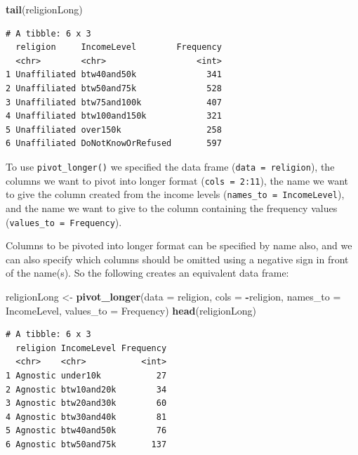 \documentclass[
]{krantz}
\makeatletter
\newenvironment{Shaded}{\begin{snugshade}}{\end{snugshade}}
\newcommand{\DataTypeTok}[1]{\textcolor[rgb]{0.27,0.27,0.27}{#1}}
\newcommand{\KeywordTok}[1]{\textcolor[rgb]{0.27,0.27,0.27}{\textbf{#1}}}
\newcommand{\NormalTok}[1]{#1}
\newcommand{\OperatorTok}[1]{\textcolor[rgb]{0.43,0.43,0.43}{\textbf{#1}}}
\newcommand{\StringTok}[1]{\textcolor[rgb]{0.5,0.5,0.5}{#1}}
\newenvironment{kframe}{%
\medskip{}
\setlength{\fboxsep}{.8em}
 \def\at@end@of@kframe{}%
 \ifinner\ifhmode%
  \def\at@end@of@kframe{\end{minipage}}%
  \begin{minipage}{\columnwidth}%
 \fi\fi%
 \def\FrameCommand##1{\hskip\@totalleftmargin \hskip-\fboxsep
 \colorbox{shadecolor}{##1}\hskip-\fboxsep
     \hskip-\linewidth \hskip-\@totalleftmargin \hskip\columnwidth}%
 \MakeFramed {\advance\hsize-\width
   \@totalleftmargin\z@ \linewidth\hsize
   \@setminipage}}%
 {\par\unskip\endMakeFramed%
 \at@end@of@kframe}
\renewenvironment{Shaded}{\begin{kframe}}{\end{kframe}}
\makeatother
\begin{document}
\begin{Shaded}
\begin{Highlighting}[]
\KeywordTok{tail}\NormalTok{(religionLong)}
\end{Highlighting}
\end{Shaded}

\begin{verbatim}
# A tibble: 6 x 3
  religion     IncomeLevel        Frequency
  <chr>        <chr>                  <int>
1 Unaffiliated btw40and50k              341
2 Unaffiliated btw50and75k              528
3 Unaffiliated btw75and100k             407
4 Unaffiliated btw100and150k            321
5 Unaffiliated over150k                 258
6 Unaffiliated DoNotKnowOrRefused       597
\end{verbatim}

To use \texttt{pivot\_longer()} we specified the data frame (\texttt{data\ =\ religion}), the columns we want to pivot into longer format (\texttt{cols\ =\ 2:11}), the name we want to give the column created from the income levels (\texttt{names\_to\ =\ \textquotesingle{}IncomeLevel\textquotesingle{}}), and the name we want to give to the column containing the frequency values (\texttt{values\_to\ =\ \textquotesingle{}Frequency\textquotesingle{}}).

Columns to be pivoted into longer format can be specified by name also, and we can also specify which columns should be omitted using a negative sign in front of the name(s). So the following creates an equivalent data frame:

\begin{Shaded}
\begin{Highlighting}[]
\NormalTok{religionLong \textless{}{-}}\StringTok{ }\KeywordTok{pivot\_longer}\NormalTok{(}\DataTypeTok{data =}\NormalTok{ religion, }\DataTypeTok{cols =} \OperatorTok{{-}}\NormalTok{religion, }
		             \DataTypeTok{names\_to =} \StringTok{\textquotesingle{}IncomeLevel\textquotesingle{}}\NormalTok{, }\DataTypeTok{values\_to =} \StringTok{\textquotesingle{}Frequency\textquotesingle{}}\NormalTok{) }
\KeywordTok{head}\NormalTok{(religionLong)}
\end{Highlighting}
\end{Shaded}

\begin{verbatim}
# A tibble: 6 x 3
  religion IncomeLevel Frequency
  <chr>    <chr>           <int>
1 Agnostic under10k           27
2 Agnostic btw10and20k        34
3 Agnostic btw20and30k        60
4 Agnostic btw30and40k        81
5 Agnostic btw40and50k        76
6 Agnostic btw50and75k       137
\end{verbatim}
\end{document}
